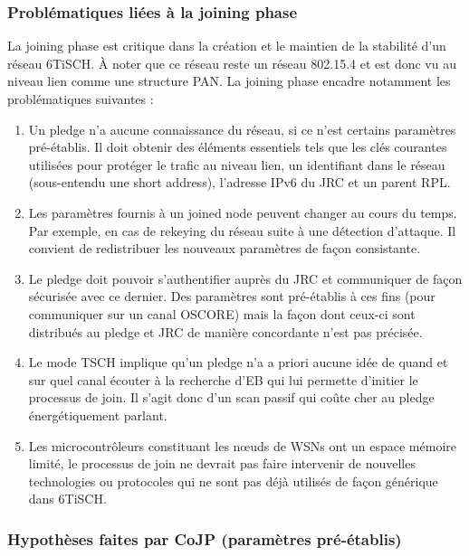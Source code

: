 \documentclass[]{report}
\begin{document}
\newpage

\subsubsection{Problématiques liées à la joining phase}

La joining phase est critique dans la création et le maintien de la stabilité d'un réseau 6TiSCH. À noter que ce réseau reste un réseau 802.15.4 et est donc vu au niveau lien comme une structure PAN. La joining phase encadre notamment les problématiques suivantes :
\vspace{0.2cm}
\begin{enumerate}
\item Un pledge n'a aucune connaissance du réseau, si ce n'est certains paramètres pré-établis. Il doit obtenir des éléments essentiels tels que les clés courantes utilisées pour protéger le trafic au niveau lien, un identifiant dans le réseau (sous-entendu une short address), l'adresse IPv6 du JRC et un parent RPL.
\vspace{0.2cm}
\item Les paramètres fournis à un joined node peuvent changer au cours du temps. Par exemple, en cas de rekeying du réseau suite à une détection d'attaque. Il convient de redistribuer les nouveaux paramètres de façon consistante.
\vspace{0.2cm}
\item Le pledge doit pouvoir s'authentifier auprès du JRC et communiquer de façon sécurisée avec ce dernier. Des paramètres sont pré-établis à ces fins (pour communiquer sur un canal OSCORE) mais la façon dont ceux-ci sont distribués au pledge et JRC de manière concordante n'est pas précisée.
\vspace{0.2cm}
\item Le mode TSCH implique qu'un pledge n'a a priori aucune idée de quand et sur quel canal écouter à la recherche d'EB qui lui permette d'initier le processus de join. Il s'agit donc d'un scan passif qui coûte cher au pledge énergétiquement parlant.
\vspace{0.2cm}
\item Les microcontrôleurs constituant les nœuds de WSNs ont un espace mémoire limité, le processus de join ne devrait pas faire intervenir de nouvelles technologies ou protocoles qui ne sont pas déjà utilisés de façon générique dans 6TiSCH.
\end{enumerate}

\subsubsection{Hypothèses faites par CoJP (paramètres pré-établis)}
\label{preshared_join}
\end{document}
